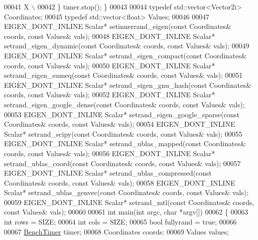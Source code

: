 \begin{DoxyCode}
00041 \textcolor{preprocessor}{        X  \(\backslash\)}
00042 \textcolor{preprocessor}{  \} timer.stop(); \}}
00043 
00044 \textcolor{keyword}{typedef} std::vector<Vector2i> Coordinates;
00045 \textcolor{keyword}{typedef} std::vector<float> Values;
00046 
00047 EIGEN\_DONT\_INLINE Scalar* setinnerrand\_eigen(\textcolor{keyword}{const} Coordinates& coords, \textcolor{keyword}{const} Values& vals);
00048 EIGEN\_DONT\_INLINE Scalar* setrand\_eigen\_dynamic(\textcolor{keyword}{const} Coordinates& coords, \textcolor{keyword}{const} Values& vals);
00049 EIGEN\_DONT\_INLINE Scalar* setrand\_eigen\_compact(\textcolor{keyword}{const} Coordinates& coords, \textcolor{keyword}{const} Values& vals);
00050 EIGEN\_DONT\_INLINE Scalar* setrand\_eigen\_sumeq(\textcolor{keyword}{const} Coordinates& coords, \textcolor{keyword}{const} Values& vals);
00051 EIGEN\_DONT\_INLINE Scalar* setrand\_eigen\_gnu\_hash(\textcolor{keyword}{const} Coordinates& coords, \textcolor{keyword}{const} Values& vals);
00052 EIGEN\_DONT\_INLINE Scalar* setrand\_eigen\_google\_dense(\textcolor{keyword}{const} Coordinates& coords, \textcolor{keyword}{const} Values& vals);
00053 EIGEN\_DONT\_INLINE Scalar* setrand\_eigen\_google\_sparse(\textcolor{keyword}{const} Coordinates& coords, \textcolor{keyword}{const} Values& vals);
00054 EIGEN\_DONT\_INLINE Scalar* setrand\_scipy(\textcolor{keyword}{const} Coordinates& coords, \textcolor{keyword}{const} Values& vals);
00055 EIGEN\_DONT\_INLINE Scalar* setrand\_ublas\_mapped(\textcolor{keyword}{const} Coordinates& coords, \textcolor{keyword}{const} Values& vals);
00056 EIGEN\_DONT\_INLINE Scalar* setrand\_ublas\_coord(\textcolor{keyword}{const} Coordinates& coords, \textcolor{keyword}{const} Values& vals);
00057 EIGEN\_DONT\_INLINE Scalar* setrand\_ublas\_compressed(\textcolor{keyword}{const} Coordinates& coords, \textcolor{keyword}{const} Values& vals);
00058 EIGEN\_DONT\_INLINE Scalar* setrand\_ublas\_genvec(\textcolor{keyword}{const} Coordinates& coords, \textcolor{keyword}{const} Values& vals);
00059 EIGEN\_DONT\_INLINE Scalar* setrand\_mtl(\textcolor{keyword}{const} Coordinates& coords, \textcolor{keyword}{const} Values& vals);
00060 
00061 \textcolor{keywordtype}{int} main(\textcolor{keywordtype}{int} argc, \textcolor{keywordtype}{char} *argv[])
00062 \{
00063   \textcolor{keywordtype}{int} rows = SIZE;
00064   \textcolor{keywordtype}{int} cols = SIZE;
00065   \textcolor{keywordtype}{bool} fullyrand = \textcolor{keyword}{true};
00066 
00067   \hyperlink{class_eigen_1_1_bench_timer}{BenchTimer} timer;
00068   Coordinates coords;
00069   Values values;

\end{DoxyCode}
